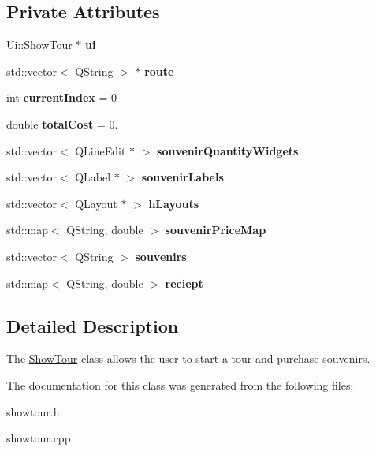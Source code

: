 \subsection*{Private Attributes}
\begin{DoxyCompactItemize}
\item 
\mbox{\label{class_show_tour_a3b84b7b3d0570a6d6e8f8780d3250c3d}} 
Ui\+::\+Show\+Tour $\ast$ {\bfseries ui}
\item 
\mbox{\label{class_show_tour_a21c70627926c86101e5727117fc1eb4e}} 
std\+::vector$<$ Q\+String $>$ $\ast$ {\bfseries route}
\item 
\mbox{\label{class_show_tour_abab84cb3f9d2af5263c17c2f3e2b366b}} 
int {\bfseries current\+Index} = 0
\item 
\mbox{\label{class_show_tour_abfca3fbed6b9ad79d10a207dab7cb5b4}} 
double {\bfseries total\+Cost} = 0.
\item 
\mbox{\label{class_show_tour_a5a19f3c0f6f560cd01c4e21d99d311f8}} 
std\+::vector$<$ Q\+Line\+Edit $\ast$ $>$ {\bfseries souvenir\+Quantity\+Widgets}
\item 
\mbox{\label{class_show_tour_a710d97232f41772fe296745461eb7a8e}} 
std\+::vector$<$ Q\+Label $\ast$ $>$ {\bfseries souvenir\+Labels}
\item 
\mbox{\label{class_show_tour_aa50b764a145ad689f13e5413cc1190b5}} 
std\+::vector$<$ Q\+Layout $\ast$ $>$ {\bfseries h\+Layouts}
\item 
\mbox{\label{class_show_tour_a646776f4db9f6da19ed42a3a34a01545}} 
std\+::map$<$ Q\+String, double $>$ {\bfseries souvenir\+Price\+Map}
\item 
\mbox{\label{class_show_tour_a606bc03a341af4590f3c69e17e780609}} 
std\+::vector$<$ Q\+String $>$ {\bfseries souvenirs}
\item 
\mbox{\label{class_show_tour_a15fc2a28ecff6daa82d8ad99bc2fe7a9}} 
std\+::map$<$ Q\+String, double $>$ {\bfseries reciept}
\end{DoxyCompactItemize}


\subsection{Detailed Description}
The \hyperlink{class_show_tour}{Show\+Tour} class allows the user to start a tour and purchase souvenirs. 

The documentation for this class was generated from the following files\+:\begin{DoxyCompactItemize}
\item 
showtour.\+h\item 
showtour.\+cpp\end{DoxyCompactItemize}
